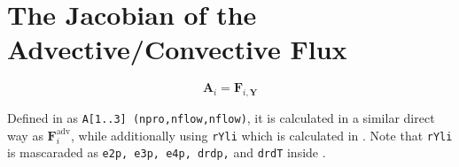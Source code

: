 \documentclass[12pt, letterpaper, twoside]{article}
\renewcommand{\vec}[1]{\bm{#1}}
\newcommand{\ttt}[1]{\texttt{#1}}
\newcommand{\A}{\vec{A}}
\newcommand{\F}{\vec{F}}
\newcommand{\0}{\vec{0}}
\begin{document}
\section{The Jacobian of the Advective/Convective Flux}
    \begin{equation}
        \A_i = \F_{i,\vec{Y}}
    \end{equation}


    Defined in  as \ttt{A[1..3] (npro,nflow,nflow)}, it is calculated in a similar direct way as \(\F_i^{\text{adv}}\), while additionally using \ttt{rYli} which is calculated in . Note that \ttt{rYli} is mascaraded as \ttt{e2p, e3p, e4p, drdp,} and \ttt{drdT} inside .
\end{document}
